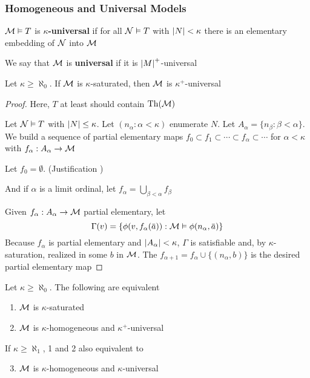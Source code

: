 \documentclass[11pt]{article}
\begin{document}
\subsubsection{Homogeneous and Universal Models}
\label{sec:orge2a0d9a}
\begin{definition}[]
\(\mathcal{M}\vDash T\) is \textbf{\(\kappa\)-universal} if for all \(\mathcal{N}\vDash T\) with \(\abs{N}<\kappa\) there is an
elementary embedding of \(\mathcal{N}\) into \(\mathcal{M}\)

We say that \(\mathcal{M}\) is \textbf{universal} if it is \(\abs{M}^+\)-universal
\end{definition}

\begin{lemma}[]
\label{lemma4.3.17}
Let \(\kappa\ge\aleph_0\). If \(\mathcal{M}\) is \(\kappa\)-saturated, then \(\mathcal{M}\) is \(\kappa^+\)-universal
\end{lemma}

\begin{proof}
Here, \(T\) at least should contain \(\operatorname{Th}(\mathcal{M})\)

Let \(\mathcal{N}\vDash T\) with \(\abs{N}\le\kappa\). Let \((n_\alpha:\alpha<\kappa)\) enumerate \(N\). Let \(A_\alpha=\{n_\beta:\beta<\alpha\}\). We
build a sequence of partial elementary maps \(f_0\subset f_1\subset\cdots\subset f_\alpha\subset\cdots\) for \(\alpha<\kappa\) with \(f_\alpha:A_\alpha\to\mathcal{M}\)

Let \(f_0=\emptyset\). (Justification \label{Problem6})

And if \(\alpha\) is a limit ordinal, let \(f_\alpha=\bigcup_{\beta<\alpha}f_\beta\)

Given \(f_\alpha:A_\alpha\to\mathcal{M}\) partial elementary, let
\begin{equation*}
\Gamma(v)=\{\phi(v,f_\alpha(\bara)):\calm\vDash\phi(n_\alpha,\bara)\}
\end{equation*}
Because \(f_\alpha\) is partial elementary and \(\abs{A_\alpha}<\kappa\), \(\Gamma\) is satisfiable and, by
\(\kappa\)-saturation, realized in some \(b\) in \(\mathcal{M}\). The \(f_{\alpha+1}=f_\alpha\cup\{(n_\alpha,b)\}\) is the desired
partial elementary map
\end{proof}

\begin{theorem}[]
Let \(\kappa\ge\aleph_0\). The following are equivalent
\begin{enumerate}
\item \(\mathcal{M}\) is \(\kappa\)-saturated
\item \(\mathcal{M}\) is \(\kappa\)-homogeneous and \(\kappa^+\)-universal
\end{enumerate}


If \(\kappa\ge\aleph_1\), 1 and 2 also equivalent to
\begin{enumerate}
\setcounter{enumi}{2}
\item \(\mathcal{M}\) is \(\kappa\)-homogeneous and \(\kappa\)-universal
\end{enumerate}
\end{theorem}
\end{document}
